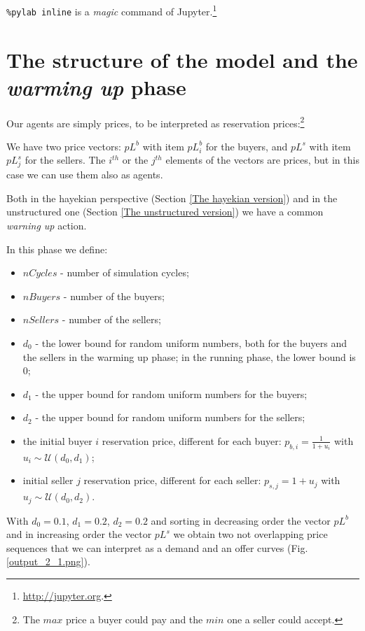 \documentclass[12pt]{report}
\begin{document}
\verb|%pylab inline| 
is a \emph{magic} command of Jupyter.\footnote{\url{http://jupyter.org}.}

\section{The structure of the model and the \emph{warming up} phase}\label{The structure of the model}

Our agents are simply prices, to be interpreted as reservation prices:\footnote{The $max$ price a buyer could pay and the $min$ one a seller could accept.}

We have two price vectors: $pL^b$ with item $pL^b_i$ for the buyers, and $pL^s$ with item $pL^s_j$ for the sellers. The $i^{th}$ or the $j^{th}$ elements of the vectors are prices, but in this case we can use them also as agents.

Both in the hayekian perspective (Section \ref{The hayekian version}) and in the unstructured one (Section \ref{The unstructured version}) we have a common \emph{warning up} action.

In this phase we define:

\begin{itemize}
\item $nCycles$ - number of simulation cycles;
\item $nBuyers$  - number of the buyers;
\item $nSellers$ - number of the sellers;
\item $d_0$ - the lower bound for random uniform numbers, both for the buyers and the sellers in the warming up phase; in the running phase, the lower bound is $0$;
\item $d_1$ - the upper bound for random uniform numbers for the buyers;
\item $d_2$ - the upper bound for random uniform numbers for the sellers;
\item the initial buyer $i$ reservation price, different for each buyer: $p_{b,i}=\frac{1} {1 + u_i}$ with $u_i\sim\mathcal{U}(d_0,d_1)$;
\item initial seller $j$ reservation price, different for each seller: $p_{s,j}=1 + u_j$ with $u_j\sim\mathcal{U}(d_0,d_2)$.
\end{itemize}

With  $d_0=0.1$, $d_1=0.2$, $d_2=0.2$ and sorting in decreasing order the vector  $pL^b$ and in increasing order the vector  $pL^s$ we obtain two not overlapping price sequences that we can interpret as a demand and an offer curves (Fig. \ref{output_2_1.png}).
\end{document}
